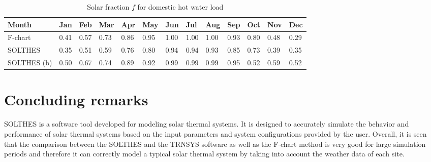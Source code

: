 \documentclass{article}
\begin{document}
\begin{table}
\caption{\label{tab:Fraction_dhw} Solar fraction $f$ for domestic hot water load}
\centering
\begin{tabular}{|l|l|l|l|l|l|l|l|l|l|l|l|l|}
\hline
Month & Jan & Feb & Mar & Apr & May & Jun & Jul & Aug & Sep & Oct & Nov & Dec \\\hline
F-chart &  0.41 & 0.57 & 0.73 & 0.86 & 0.95 & 1.00 & 1.00	& 1.00 & 0.93 & 0.80 & 0.48 & 0.29  \\\hline
SOLTHES & 0.35 &	0.51 & 0.59 & 0.76 & 0.80 &	0.94 & 0.94 & 0.93 & 0.85 &	0.73 &	0.39 &	0.35  \\\hline
SOLTHES (b) & 0.50 & 0.67 &	0.74 &	0.89 &	0.92 &	0.99 &	0.99 &	0.99 &	0.95 &	0.52 &	0.59 &	0.52 \\\hline
\end{tabular}
\end{table}

\section{Concluding remarks}
SOLTHES is a software tool developed for modeling solar thermal systems. It is designed to accurately simulate the behavior and performance of solar thermal systems based on the input parameters and system configurations provided by the user. Overall, it is seen that the comparison between the SOLTHES and the TRNSYS software as well as the F-chart method is very good for large simulation periods and therefore it can correctly model a typical solar thermal system by taking into account the weather data of each site. 


\end{document}
